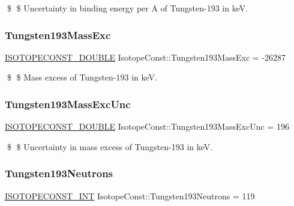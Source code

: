 \$ \$ Uncertainty in binding energy per A of Tungsten-\/193 in keV. \mbox{\label{group___isotope_const-_tungsten-_w193_ga9b5a76d3e4bddf486656b82c55954373}} 
\subsubsection{\texorpdfstring{Tungsten193\+Mass\+Exc}{Tungsten193MassExc}}
{\footnotesize\ttfamily \mbox{\hyperlink{group___isotope_const-_macros_ga8f45a7272ce02c0b4c65c44636ed719a}{I\+S\+O\+T\+O\+P\+E\+C\+O\+N\+S\+T\+\_\+\+D\+O\+U\+B\+LE}} Isotope\+Const\+::\+Tungsten193\+Mass\+Exc = -\/26287}

\$ \$ Mass excess of Tungsten-\/193 in keV. \mbox{\label{group___isotope_const-_tungsten-_w193_ga638f089adf44d36eb0f9e442312e5023}} 
\subsubsection{\texorpdfstring{Tungsten193\+Mass\+Exc\+Unc}{Tungsten193MassExcUnc}}
{\footnotesize\ttfamily \mbox{\hyperlink{group___isotope_const-_macros_ga8f45a7272ce02c0b4c65c44636ed719a}{I\+S\+O\+T\+O\+P\+E\+C\+O\+N\+S\+T\+\_\+\+D\+O\+U\+B\+LE}} Isotope\+Const\+::\+Tungsten193\+Mass\+Exc\+Unc = 196}

\$ \$ Uncertainty in mass excess of Tungsten-\/193 in keV. \mbox{\label{group___isotope_const-_tungsten-_w193_ga136600f2184b22e76918b63e50a3f132}} 
\subsubsection{\texorpdfstring{Tungsten193\+Neutrons}{Tungsten193Neutrons}}
{\footnotesize\ttfamily \mbox{\hyperlink{group___isotope_const-_macros_ga5f18360b3e99483a35c32d789e62621c}{I\+S\+O\+T\+O\+P\+E\+C\+O\+N\+S\+T\+\_\+\+I\+NT}} Isotope\+Const\+::\+Tungsten193\+Neutrons = 119}

